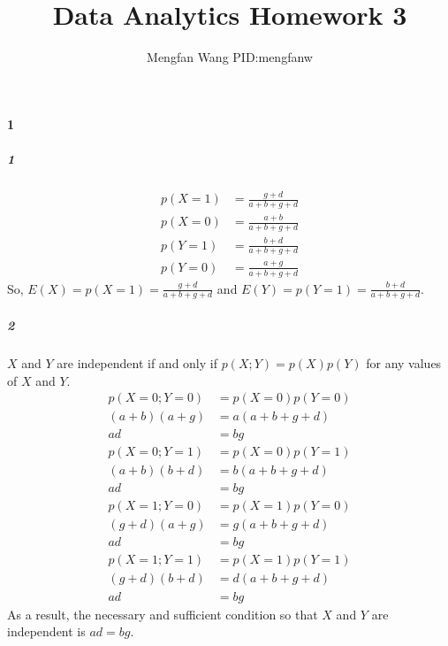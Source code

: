 \documentclass[22pt]{article}
\author{Mengfan Wang PID:mengfanw}
\title{Data Analytics Homework 3}
\begin{document}
	\maketitle 
	\paragraph{1}
		\subparagraph{1}
		\begin{align}
			p(X = 1) & = \frac{g+d}{a+b+g+d}\\
			p(X = 0) & = \frac{a+b}{a+b+g+d}\\
			p(Y = 1) & = \frac{b+d}{a+b+g+d}\\
			p(Y = 0) & = \frac{a+g}{a+b+g+d}
		\end{align}
		So, $E(X) = p(X=1)= \frac{g+d}{a+b+g+d}$ and $E(Y) = p(Y = 1) =  \frac{b+d}{a+b+g+d}$.
 
		\subparagraph{2} $X$ and $Y$ are independent if and only if $p(X;Y) = p(X)p(Y)$ for any values of $X$ and $Y$.
		\begin{align}
			p(X=0;Y=0) & = p(X=0)p(Y=0)\\
			 (a+b)(a+g)& = a(a+b+g+d)\\
			 ad& =bg\\
			 p(X=0;Y=1) & = p(X=0)p(Y=1)\\
			 (a+b)(b+d) & = b(a+b+g+d)\\
			 ad& =bg\\
			 p(X=1;Y=0) & = p(X=1)p(Y=0)\\
			 (g+d)(a+g)& = g(a+b+g+d)\\
			 ad& =bg\\
			 p(X=1;Y=1) & = p(X=1)p(Y=1)\\
			 (g+d)(b+d)& = d(a+b+g+d)\\
			 ad& =bg
		\end{align}
		As a result, the necessary and sufficient condition so that $X$ and $Y$ are independent is $ad = bg$.
\end{document}
